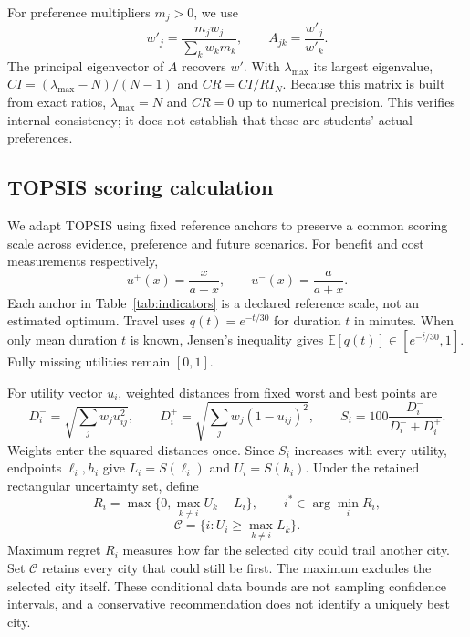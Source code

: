 For preference multipliers $m_j>0$, we use
\begin{equation}
 w'_j=\frac{m_jw_j}{\sum_kw_km_k},\qquad A_{jk}=\frac{w'_j}{w'_k}.
 \label{eq:weights}
\end{equation}
The principal eigenvector of $A$ recovers $w'$. With $\lambda_{\max}$ its
largest eigenvalue, $CI=(\lambda_{\max}-N)/(N-1)$ and $CR=CI/RI_N$.
Because this matrix is built from exact ratios, $\lambda_{\max}=N$ and
$CR=0$ up to numerical precision. This verifies internal consistency;
it does not establish that these are students' actual preferences.

\subsection{TOPSIS scoring calculation}
We adapt TOPSIS \cite{topsis} using fixed reference anchors to preserve a common scoring scale across evidence,
preference and future scenarios. For benefit and cost measurements respectively,
\begin{equation}
 u^{+}(x)=\frac{x}{a+x},\qquad u^{-}(x)=\frac{a}{a+x}.
\end{equation}
Each anchor in Table~\ref{tab:indicators} is a declared reference scale, not
an estimated optimum. Travel uses $q(t)=e^{-t/30}$ for duration $t$ in minutes.
When only mean duration $\bar t$ is known, Jensen's inequality gives
$\mathbb E[q(t)]\in[e^{-\bar t/30},1]$. Fully missing utilities remain $[0,1]$.

For utility vector $u_i$, weighted distances from fixed worst and best points are
\begin{equation}
 D_i^-=\sqrt{\sum_jw_ju_{ij}^2},\qquad
 D_i^+=\sqrt{\sum_jw_j(1-u_{ij})^2},\qquad
 S_i=100\frac{D_i^-}{D_i^-+D_i^+}.
\end{equation}
Weights enter the squared distances once. Since $S_i$ increases with every
utility, endpoints $\ell_i,h_i$ give $L_i=S(\ell_i)$ and $U_i=S(h_i)$.
Under the retained rectangular uncertainty set, define
\begin{equation}
 R_i=\max\{0,\max_{k\ne i}U_k-L_i\},\qquad
 i^*\in\arg\min_iR_i,
 \label{eq:regret}
\end{equation}
\begin{equation}
 \mathcal C=\{i:U_i\geq\max_{k\ne i}L_k\}.
\end{equation}
Maximum regret $R_i$ measures how far the selected city could trail another
city. Set $\mathcal C$ retains every city that could still be first.
The maximum excludes the selected city itself. These conditional data bounds
are not sampling confidence intervals, and a conservative recommendation does
not identify a uniquely best city.

